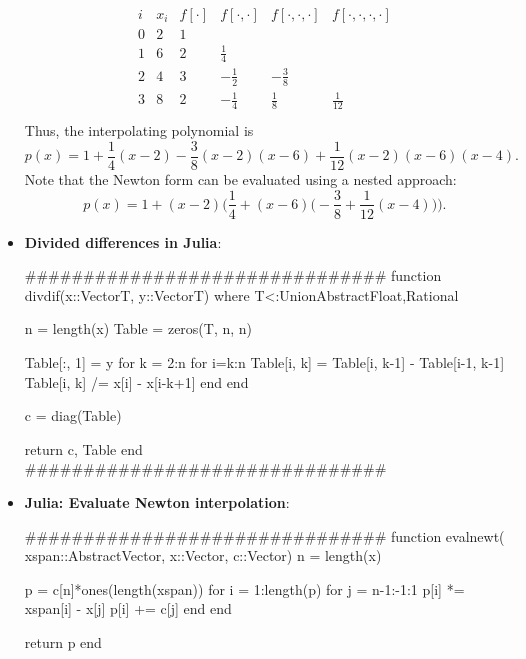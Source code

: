 \documentclass{report}
\begin{document}
\begin{itemize}
\begin{align*}
    \begin{array}{c|c|cccc}
        i & x_i & f[\cdot] & f[\cdot,\cdot] & f[\cdot,\cdot,\cdot] & f[\cdot,\cdot,\cdot,\cdot] \\
        \hline
        0 & 2 & 1 &  &  \\
        1 & 6 & 2 & \frac{1}{4} &  \\
        2 & 4 & 3 & -\frac{1}{2} & -\frac38 & \\
        3 & 8 & 2 & -\frac{1}{4} & \frac18 & \frac{1}{12} \\
    \end{array}
\end{align*}
\bigbreak \noindent 
Thus, the interpolating polynomial is 
$$
p(x) = 1 + \frac14(x-2) - \frac38(x-2)(x-6) + \frac{1}{12}(x-2)(x-6)(x-4).
$$
Note that the Newton form can be evaluated using a nested approach:
$$
p(x) = 1 + (x-2)\Bigg( \frac14 + (x-6)\bigg(-\frac38 + \frac{1}{12}(x-4)\bigg) \Bigg).
$$
\item \textbf{Divided differences in Julia}:
    \bigbreak \noindent 
    \begin{cppcode}
###############################
function divdif(x::Vector{T}, y::Vector{T}) where T<:Union{AbstractFloat,Rational}

    n = length(x)
    Table = zeros(T, n, n)
    
    Table[:, 1] = y
    for k = 2:n
        for i=k:n
            Table[i, k] = Table[i, k-1] - Table[i-1, k-1]
            Table[i, k] /= x[i] - x[i-k+1]
        end
    end
    
    c = diag(Table)
    
    return c, Table
end
###############################
    \end{cppcode}
\item \textbf{Julia: Evaluate Newton interpolation}: 
    \bigbreak \noindent 
    \begin{cppcode}
###############################
function evalnewt(
        xspan::AbstractVector, 
        x::Vector, 
        c::Vector)
    n = length(x)
    
    p = c[n]*ones(length(xspan))
    for i = 1:length(p)
        for j = n-1:-1:1
            p[i] *= xspan[i] - x[j]
            p[i] += c[j]
        end
    end
    
    return p
end


\end{cppcode}
\end{itemize}
\end{document}
